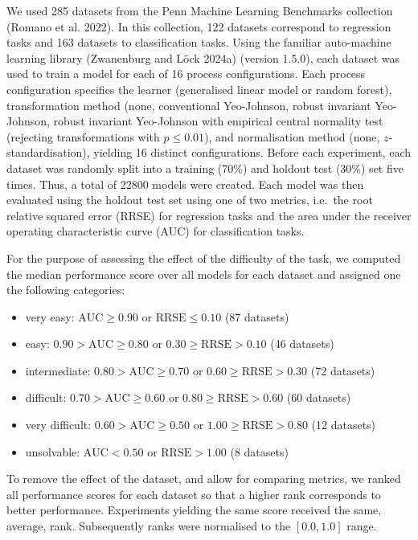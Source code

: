 \documentclass[
  a4paper,
]{article}
\providecommand{\tightlist}{%
  \setlength{\itemsep}{0pt}\setlength{\parskip}{0pt}}
\begin{document}
We used 285 datasets from the Penn Machine Learning Benchmarks
collection (Romano et al. 2022). In this collection, 122 datasets
correspond to regression tasks and 163 datasets to classification tasks.
Using the familiar auto-machine learning library (Zwanenburg and Löck
2024a) (version 1.5.0), each dataset was used to train a model for each
of 16 process configurations. Each process configuration specifies the
learner (generalised linear model or random forest), transformation
method (none, conventional Yeo-Johnson, robust invariant Yeo-Johnson,
robust invariant Yeo-Johnson with empirical central normality test
(rejecting transformations with \(p \leq 0.01\)), and normalisation
method (none, \(z\)-standardisation), yielding 16 distinct
configurations. Before each experiment, each dataset was randomly split
into a training (70\%) and holdout test (30\%) set five times. Thus, a
total of 22800 models were created. Each model was then evaluated using
the holdout test set using one of two metrics, i.e.~the root relative
squared error (RRSE) for regression tasks and the area under the
receiver operating characteristic curve (AUC) for classification tasks.

For the purpose of assessing the effect of the difficulty of the task,
we computed the median performance score over all models for each
dataset and assigned one the following categories:

\begin{itemize}
\tightlist
\item
  very easy: \(\text{AUC} \geq 0.90\) or \(\text{RRSE} \leq 0.10\) (87
  datasets)
\item
  easy: \(0.90 > \text{AUC} \geq 0.80\) or
  \(0.30 \geq \text{RRSE} > 0.10\) (46 datasets)
\item
  intermediate: \(0.80 > \text{AUC} \geq 0.70\) or
  \(0.60 \geq \text{RRSE} > 0.30\) (72 datasets)
\item
  difficult: \(0.70 > \text{AUC} \geq 0.60\) or
  \(0.80 \geq \text{RRSE} > 0.60\) (60 datasets)
\item
  very difficult: \(0.60 > \text{AUC} \geq 0.50\) or
  \(1.00 \geq \text{RRSE} > 0.80\) (12 datasets)
\item
  unsolvable: \(\text{AUC} < 0.50\) or \(\text{RRSE} > 1.00\) (8
  datasets)
\end{itemize}

To remove the effect of the dataset, and allow for comparing metrics, we
ranked all performance scores for each dataset so that a higher rank
corresponds to better performance. Experiments yielding the same score
received the same, average, rank. Subsequently ranks were normalised to
the \([0.0, 1.0]\) range.
\end{document}
